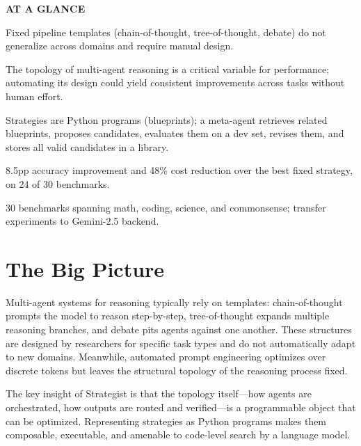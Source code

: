 \documentclass[10pt,twocolumn]{article}
\begin{document}
\begin{mdframed}[backgroundcolor=boxgray,linecolor=rulered,linewidth=1pt,
    innerleftmargin=6pt,innerrightmargin=6pt,
    innertopmargin=6pt,innerbottommargin=6pt]
\textbf{\small AT A GLANCE}\par\vspace{4pt}
\begin{description}[leftmargin=0pt,labelsep=4pt,itemsep=2pt,parsep=0pt,
    font=\small\bfseries]
  \item[Problem:] Fixed pipeline templates (chain-of-thought, tree-of-thought,
    debate) do not generalize across domains and require manual design.
  \item[Why it matters:] The topology of multi-agent reasoning is a critical
    variable for performance; automating its design could yield consistent
    improvements across tasks without human effort.
  \item[Method:] Strategies are Python programs (blueprints); a meta-agent
    retrieves related blueprints, proposes candidates, evaluates them on a
    dev set, revises them, and stores all valid candidates in a library.
  \item[Result:] 8.5pp accuracy improvement and 48\% cost reduction over
    the best fixed strategy, on 24 of 30 benchmarks.
  \item[Evidence:] 30 benchmarks spanning math, coding, science, and
    commonsense; transfer experiments to Gemini-2.5 backend.
\end{description}
\end{mdframed}

\section{The Big Picture}

Multi-agent systems for reasoning typically rely on templates: chain-of-thought
prompts the model to reason step-by-step, tree-of-thought expands multiple
reasoning branches, and debate pits agents against one another. These
structures are designed by researchers for specific task types and do not
automatically adapt to new domains. Meanwhile, automated prompt engineering
optimizes over discrete tokens but leaves the structural topology of the
reasoning process fixed.

The key insight of Strategist is that the topology itself---how agents
are orchestrated, how outputs are routed and verified---is a programmable
object that can be optimized. Representing strategies as Python programs
makes them composable, executable, and amenable to code-level search by
a language model.
\end{document}
